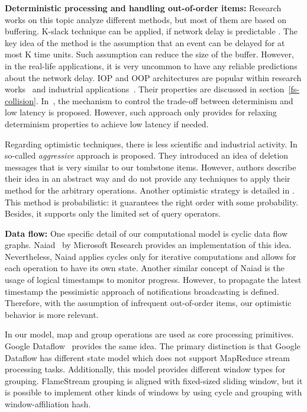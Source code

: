
\label {fs-related-section}

{\bf Deterministic processing and handling out-of-order items:}
Research works on this topic analyze different methods, but most of them are based on buffering. K-slack technique can be applied, if network delay is predictable \cite{Babu:2004:EKC:1016028.1016032}. The key idea of the method is the assumption that an event can be delayed for at most K time units. Such assumption can reduce the size of the buffer. However, in the real-life applications, it is very uncommon to have any reliable predictions about the network delay. IOP and OOP architectures are popular within research works~\cite{Cranor:2003:GSD:872757.872838, Arasu:2006:CCQ:1146461.1146463, Li:2008:OPN:1453856.1453890} and industrial applications~\cite{carbone2015apache, Akidau:2013:MFS:2536222.2536229}. Their properties are discussed in section~\ref{fs-collision}. In~\cite{Zacheilas:2017:MDS:3093742.3093921}, the mechanism to control the trade-off between determinism and low latency is proposed. However, such approach only provides for relaxing determinism properties to achieve low latency if needed.

Regarding optimistic techniques, there is less scientific and industrial activity. In \cite{Wei:2009:SSO:1559845.1559973} so-called {\it aggressive} approach is proposed. They introduced an idea of deletion messages that is very similar to our tombstone items. However, authors describe their idea in an abstract way and do not provide any techniques to apply their method for the arbitrary operations. Another optimistic strategy is detailed in \cite{Li2011}. This method is probabilistic: it guarantees the right order with some probability. Besides, it supports only the limited set of query operators.

{\bf Data flow:}
One specific detail of our computational model is cyclic data flow graphs. Naiad~\cite{Murray:2013:NTD:2517349.2522738} by Microsoft Research provides an implementation of this idea. Nevertheless, Naiad applies cycles only for iterative computations and allows for each operation to have its own state. Another similar concept of Naiad is the usage of logical timestamps to monitor progress. However, to propagate the latest timestamp the pessimistic approach of notifications broadcasting is defined. Therefore, with the assumption of infrequent out-of-order items, our optimistic behavior is more relevant.

In our model, map and group operations are used as core processing primitives. Google Dataflow~\cite{Akidau:2015:DMP:2824032.2824076} provides the same idea. The primary distinction is that Google Dataflow has different state model which does not support MapReduce stream processing tasks. Additionally, this model provides different window types for grouping. FlameStream grouping is aligned with fixed-sized sliding window, but it is possible to implement other kinds of windows by using cycle and grouping with window-affiliation hash.
